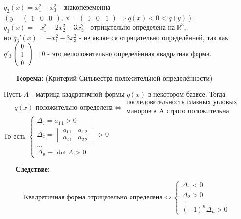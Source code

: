 \documentclass[12pt, letterpaper, twoside]{article}
\begin{document}
    $q_2(x) = x_1^2 - x_3^2$ - знакопеременна $\left(y = \begin{pmatrix}
        1 & 0 & 0
    \end{pmatrix},\ x =\begin{pmatrix}
        0 & 0 & 1
    \end{pmatrix}\Rightarrow q(x) < 0 < q(y)\right)$.\\
    $q_3(x) = -x^2_1 - 2x_2^2 - 3x_3^2$ - отрицательно определена на $\mathbb{R}^3$,\\
    но $q_3'(x) = -x^2_1 - 3x_3^2$ - не является отрицательно определённой, так как $q'_3\begin{pmatrix}
        0\\
        1\\
        0
    \end{pmatrix} = 0$ - это неположительно определённая квадратная форма.
    \begin{enumerate}
        \item[\textbf{Теорема:}] (Критерий Сильвестра положительной определённости)
    \end{enumerate}
    Пусть $A$ - матрица квадратичной формы $q(x)$ в некотором базисе. Тогда
    \[q(x)\text{ положительно определена}\Leftrightarrow \begin{matrix}\text{последовательность главных угловых}\\ \text{миноров в A строго положительна} \end{matrix}\]
    То есть $\begin{cases}
        \Delta_1 = a_{1\, 1} > 0\\
        \Delta_2 = \begin{vmatrix}
            a_{1\, 1} & a_{1\, 2}\\
            a_{2\, 1} & a_{2\, 2}
        \end{vmatrix} > 0\\
        \dots\\
        \Delta_{n} = \det A > 0
    \end{cases}$
    \begin{enumerate}
        \item[\textbf{Следствие:}]
    \end{enumerate}
    \[\text{Квадратичная форма отрицательно определена}\Leftrightarrow \begin{cases}
        \Delta_1 < 0\\
        \Delta_2 > 0\\
        \dots\\
        (-1)^n\Delta_n > 0
    \end{cases}\]
\end{document}
